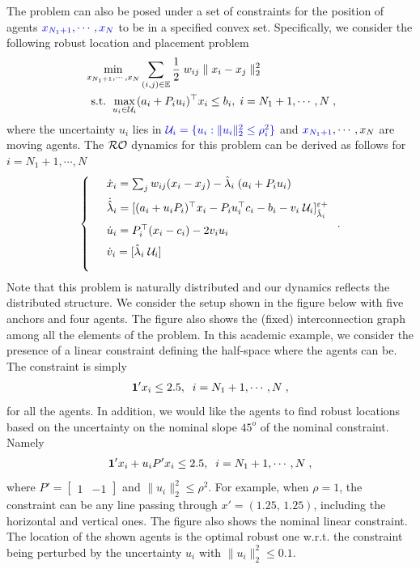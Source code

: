 \documentclass[journal,twoside,web]{ieeecolor}
\newcommand{\rev}[1]{\textcolor{revisionblue}{#1}}
\begin{document}
\rev{The problem can also be posed under} a set of constraints for the position of agents $\rev{x_{N_1+1},\cdots,x_{N}}$ to be in a specified convex set. Specifically, we consider the following robust location and placement problem
\begin{align*}
    &\min_{x_{N_1+1},\cdots,x_N} \sum_{(i,j)\in {\mathbb E}} \frac{1}{2}\; w_{ij} \parallel x_i - x_j \parallel_2^2\\
    &\;\;\text{s.t.}\;\;\underset{u_i\in {\cal U}_i}{\max} (a_i+P_i u_i)^\top x_i \leq b_i, \; i={N_1+1},\cdots,N\;,
\end{align*}
where the uncertainty $u_i$ lies in $\rev{{\cal U}_i = \{ u_i : \| u_i \|_2^2 \leq \rho_i^2 \}}$ and $\rev{x_{N_1+1}},\cdots,x_{N}$ are moving agents. The ${\cal RO}$ dynamics for this problem can be derived as follows for $i=N_1+1,\cdots,N$
\begin{align*}
\left\{
\begin{array}{cl}
\vspace{2mm}
&\dot{x}_i=\sum_j w_{ij} (x_i-x_j)-\hat \lambda_i \; (a_i+P_i u_i)\\
\vspace{2mm}
&\dot{\hat \lambda}_i=[(a_i+u_i P_i)^\top x_i-P_i u_i^\top c_i-b_i-v_i\; \mathcal{U}_i]_{\hat \lambda_i}^{\varepsilon+}\\
\vspace{2mm}
&\dot{u}_i=P_i^\top (x_i-c_i)-2v_i u_i\\
\vspace{2mm}
&\dot{v}_i=[\hat \lambda_i\; \mathcal{U}_i]
\vspace{2mm}
\end{array}\right..
\end{align*}
Note that this problem is naturally distributed and our dynamics reflects the distributed structure. We consider the setup shown in the figure below with five anchors and four agents. The figure also shows the (fixed) interconnection graph among all the elements of the problem. In this academic example, we consider the presence of a linear constraint defining the half-space where the agents can be. The constraint is simply
\begin{align*}
{\bf 1}'x_i\leq 2.5, \;\; i=N_1+1,\cdots,N\;,
\end{align*}
for all the agents.
In addition, we would like the agents to find robust locations based on the uncertainty on the nominal slope $45^o$ of the nominal constraint. Namely
\begin{align*}
{\bf 1}'x_i+u_iP'x_i\leq 2.5,\;\; i=N_1+1,\cdots,N\;,
\end{align*}
where $P'=\begin{bmatrix}1&-1\end{bmatrix}$ and $\|u_i\|_2^2\leq \rho^2$. For example, when $\rho=1$, the constraint can be any line passing through $x'=(1.25,\,1.25)$, including the horizontal and vertical ones. The figure also shows the nominal linear constraint. The location of the shown agents is the optimal robust one w.r.t. the constraint being perturbed by the uncertainty $u_i$ with $\|u_i\|_2^2\leq 0.1$.
\end{document}
